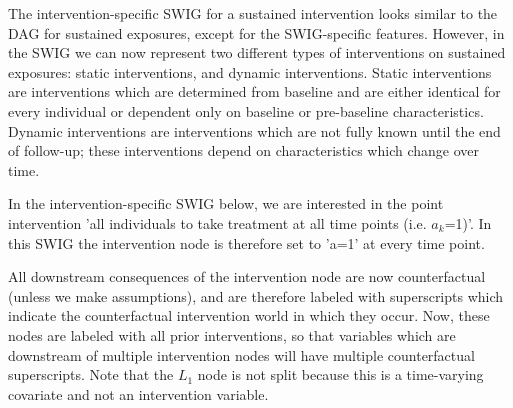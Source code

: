 \documentclass[a4paper]{report}
\begin{document}
The intervention-specific SWIG for a sustained intervention looks similar to the DAG for sustained exposures, except for the SWIG-specific features. However, in the SWIG we can now represent two different types of interventions on sustained exposures: static interventions, and dynamic interventions. Static interventions are interventions which are determined from baseline and are either identical for every individual or dependent only on baseline or pre-baseline characteristics. Dynamic interventions are interventions which are not fully known until the end of follow-up; these interventions depend on characteristics which change over time. 

In the intervention-specific SWIG below, we are interested in the point intervention 'all individuals to take treatment at all time points (i.e. $a_k$=1)'. In this SWIG the intervention node is therefore set to 'a=1' at every time point. 

All downstream consequences of the intervention node are now counterfactual (unless we make assumptions), and are therefore labeled with superscripts which indicate the counterfactual intervention world in which they occur. Now, these nodes are labeled with all prior interventions, so that variables which are downstream of multiple intervention nodes will have multiple counterfactual superscripts. Note that the $L_1$ node is not split because this is a time-varying covariate and not an intervention variable.

\vspace{3mm}
\end{document}
